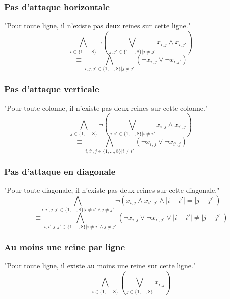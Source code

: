 \subsubsection*{Pas d'attaque horizontale}
"Pour toute ligne, il n'existe pas deux reines sur cette ligne."
\begin{equation*}
    \bigwedge_{i \in \{1,\dots,8\}} \neg (\bigvee_{j,j' \in \{1,\dots,8\} | j \neq j'} x_{i,j} \wedge x_{i,j'})
\end{equation*}
\begin{equation*}
    \equiv \bigwedge_{i,j,j' \in \{1,\dots,8\} | j \neq j'} (\neg x_{i,j} \vee \neg x_{i,j'})
\end{equation*}
\subsubsection*{Pas d'attaque verticale}
"Pour toute colonne, il n'existe pas deux reines sur cette colonne."
\begin{equation*}
    \bigwedge_{j \in \{1,\dots,8\}} \neg (\bigvee_{i,i' \in \{1,\dots,8\} | i \neq i'} x_{i,j} \wedge x_{i',j})
\end{equation*}
\begin{equation*}
    \equiv \bigwedge_{i,i',j \in \{1,\dots,8\} | i \neq i'} (\neg x_{i,j} \vee \neg x_{i',j})
\end{equation*}
\subsubsection*{Pas d'attaque en diagonale}
"Pour toute diagonale, il n'existe pas deux reines sur cette diagonale."
\begin{equation*}
    \bigwedge_{i,i',j,j' \in \{1,\dots,8\} | i \neq i' \wedge j \neq j'} \neg (x_{i,j} \wedge x_{i',j'} \wedge |i-i'| = |j-j'|)
\end{equation*}
\begin{equation*}
    \equiv \bigwedge_{i,i',j,j' \in \{1,\dots,8\} | i \neq i' \wedge j \neq j'} (\neg x_{i,j} \vee \neg x_{i',j'} \vee |i-i'| \neq |j-j'|)
\end{equation*}
\subsubsection*{Au moins une reine par ligne}
"Pour toute ligne, il existe au moins une reine sur cette ligne."
\begin{equation*}
    \bigwedge_{i \in \{1,\dots,8\}} (\bigvee_{j \in \{1,\dots,8\}} x_{i,j})
\end{equation*}

